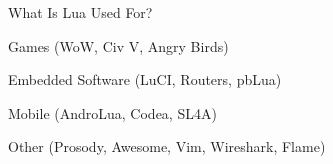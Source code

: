 \begin{itemslide}{What Is Lua Used For?}
\item Games (WoW, Civ V, Angry Birds)
\item Embedded Software (LuCI, Routers, pbLua)
\item Mobile (AndroLua, Codea, SL4A)
\item Other (Prosody, Awesome, Vim, Wireshark, Flame)
\end{itemslide}
